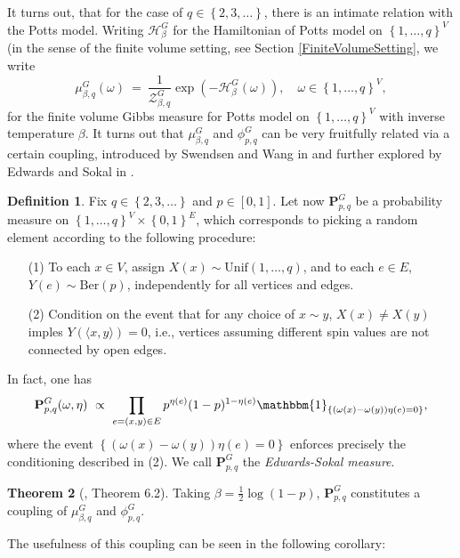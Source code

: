 \documentclass[12pt]{article}
\renewcommand{\H}{\mathcal{H}}
\newcommand{\PP}{\mathbf{P}}
\newcommand{\ZZ}{\mathcal{Z}}
\newcommand{\set}[1]{\left\{#1\right\}}
\newcommand{\1}{\mathbbm{1}}
\renewcommand{\sp}[1]{\langle #1\rangle}
\newcommand{\5}{\vspace{0.5cm}}
\theoremstyle{definition}
\newtheorem{thm}{Theorem}[section]
\newtheorem{df}[thm]{Definition}
\begin{document}
It turns out, that for the case of $q\in\set{2,3,\ldots}$, there is an intimate relation with the Potts model. Writing $\H_\beta^G$ for the Hamiltonian of Potts model on $\set{1,\ldots,q}^V$ (in the sense of the finite volume setting, see Section \ref{FiniteVolumeSetting}, we write
$$\mu_{\beta,q}^G(\omega) ~=~ \frac{1}{\ZZ_{\beta,q}^G}\exp(-\H_\beta^G(\omega)), \quad \omega\in\set{1,\ldots,q}^V,$$
for the finite volume Gibbs measure for Potts model on $\set{1,\ldots,q}^V$ with inverse temperature $\beta$. It turns out that $\mu_{\beta,q}^G$ and $\phi_{p,q}^G$ can be very fruitfully related via a certain coupling, introduced by Swendsen and Wang in \cite{SW} and further explored  by Edwards and Sokal in \cite{ES}.

\begin{df}\label{def:EdwardsSokal}
Fix $q\in\set{2,3,\ldots}$ and $p\in[0,1]$. Let now $\PP_{p,q}^G$ be a probability measure on $\set{1,\ldots,q}^V\times\set{0,1}^E$, which corresponds to picking a random element according to the following procedure:
\begin{itemize}
	\item[(1)] To each $x\in V$, assign $X(x)\sim\mathrm{Unif}(1,\ldots,q)$, and to each $e\in E$, $Y(e)\sim\mathrm{Ber}(p)$, independently for all vertices and edges.
	\item[(2)] Condition on the event that for any choice of $x\sim y$, $X(x)\neq X(y)$ imples $Y(\sp{x,y})=0$, i.e., vertices assuming different spin values are not connected by open edges.
\end{itemize}
In fact, one has
$$\PP_{p,q}^G(\omega,\eta) ~\propto~ \prod_{e=(x,y)\in E}p^{\eta(e)}(1-p)^{1-\eta(e)}\1_{\set{(\omega(x)-\omega(y))\eta(e)=0}},$$
where the event $\set{(\omega(x)-\omega(y))\eta(e)=0}$ enforces precisely the conditioning described in (2). We call $\PP_{p,q}^G$ the \textit{Edwards-Sokal measure}.
\end{df}

\begin{thm}[\cite{GHM}, Theorem 6.2]
Taking $\beta=\frac{1}{2}\log(1-p)$, $\PP_{p,q}^G$ constitutes a coupling of $\mu_{\beta,q}^G$ and $\phi_{p,q}^G$.	
\end{thm}

The usefulness of this coupling can be seen in the following corollary:
\end{document}
